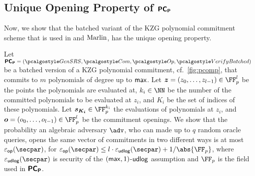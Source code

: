 \subsection{Unique Opening Property of $\bm{\mathsf{PC}}_{\bm{\mathsf{P}}}$}
\label{sec:uop}
Now, we show that the batched variant of the KZG polynomial
commitment scheme that is used in \plonk{} and ${\textnormal{{Marlin}}}{}$, has the unique opening property.

\begin{lemma}
\label{lem:pcomp_op}
Let $\PCOMp = (\kgen, \com, \open, \verifyb)$ be a batched version of a KZG polynomial commitment,
cf.~\cref{fig:pcomp}, that commits to $m$ polynomials of degree up to $\mathsf{max}$. Let $\vec{z} = (z_0, \ldots, z_{l - 1}) \in \FF_p^l$ be the points the polynomials are  evaluated at, $k_i \in \NN$ be the number of the committed polynomials to be evaluated at $z_i$, and $K_i$ be the set of indices of these polynomials. Let $\vec{s_{K_i}} \in \FF_p^{k_i}$ the evaluations of polynomials at $z_i$, and $\vec{o} = (o_0, \ldots, o_{l - 1}) \in \FF_p^l$ be the commitment openings. We show that the probability an algebraic adversary $\adv$, who can made up to $q$ random oracle queries, opens the same vector of commitments in two different ways is at most $\epsop(\secpar)$, for $\epsop(\secpar) \leq l \cdot  \epsudlog(\secpar) + \infrac{1}{\abs{\FF_p}}$, where $\epsudlog(\secpar)$ is security of the $(\mathsf{max}, 1)$-$\mathsf{udlog}$ assumption and $\FF_p$ is the field used in $\bm{\mathsf{PC}}_{\bm{\mathsf{P}}}$.
\end{lemma}
